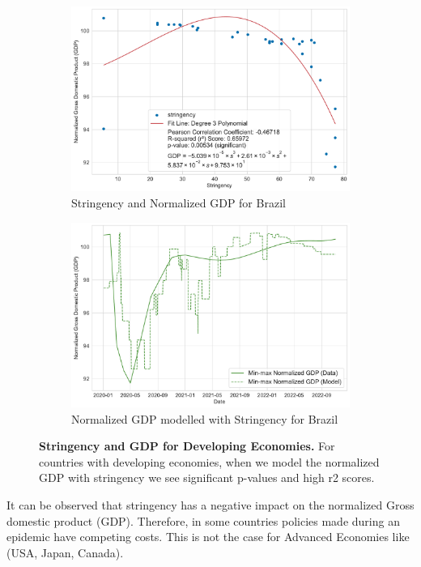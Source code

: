 \documentclass[tikz,fleqn,12pt]{wlscirep}
\begin{document}
\begin{figure}[htbp!]
  \begin{subfigure}[t]{0.48\textwidth}
    \centering
    \includegraphics[width=\linewidth]{images/stringency_vs_gdp_BRA.pdf}
    \caption{Stringency and Normalized GDP for Brazil}
  \end{subfigure}
  \label{fig:stringency_vs_gdp_BRA}
  \hfill
  \begin{subfigure}[t]{0.48\textwidth}
    \centering
    \includegraphics[width=\linewidth]{images/gdp_modelled_with_stringency_BRA.pdf}
    \caption{Normalized GDP modelled with Stringency for Brazil}
  \end{subfigure}
  \label{fig:gdp_modelled_with_stringency_BRA}
  \caption{\textbf{Stringency and GDP for Developing Economies.} For countries with developing economies, when we model the normalized GDP with stringency we see significant p-values and high r2 scores.}
\end{figure}
It can be observed that stringency has a negative impact on the normalized Gross domestic product (GDP). Therefore, in some countries policies made during an epidemic have competing costs. This is not the case for Advanced Economies like (USA, Japan, Canada).
\end{document}
